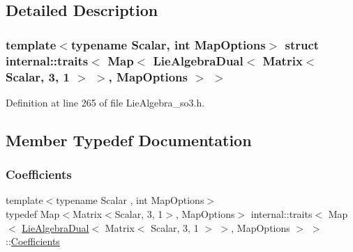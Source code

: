 \subsection{Detailed Description}
\subsubsection*{template$<$typename Scalar, int Map\+Options$>$\newline
struct internal\+::traits$<$ Map$<$ Lie\+Algebra\+Dual$<$ Matrix$<$ Scalar, 3, 1 $>$ $>$, Map\+Options $>$ $>$}



Definition at line 265 of file Lie\+Algebra\+\_\+so3.\+h.



\subsection{Member Typedef Documentation}
\hypertarget{structinternal_1_1traits_3_01_map_3_01_lie_algebra_dual_3_01_matrix_3_01_scalar_00_013_00_011_01e8a24fa295b52ac8e6af43d3afd0f30d_ab5f11b84b668c4441e8bc5864fd37e84}{}\label{structinternal_1_1traits_3_01_map_3_01_lie_algebra_dual_3_01_matrix_3_01_scalar_00_013_00_011_01e8a24fa295b52ac8e6af43d3afd0f30d_ab5f11b84b668c4441e8bc5864fd37e84} 
\subsubsection{\texorpdfstring{Coefficients}{Coefficients}}
{\footnotesize\ttfamily template$<$typename Scalar , int Map\+Options$>$ \\
typedef Map$<$Matrix$<$Scalar, 3, 1$>$, Map\+Options$>$ internal\+::traits$<$ Map$<$ \hyperlink{class_lie_algebra_dual}{Lie\+Algebra\+Dual}$<$ Matrix$<$ Scalar, 3, 1 $>$ $>$, Map\+Options $>$ $>$\+::\hyperlink{structinternal_1_1traits_3_01_map_3_01_lie_algebra_dual_3_01_matrix_3_01_scalar_00_013_00_011_01e8a24fa295b52ac8e6af43d3afd0f30d_ab5f11b84b668c4441e8bc5864fd37e84}{Coefficients}}



